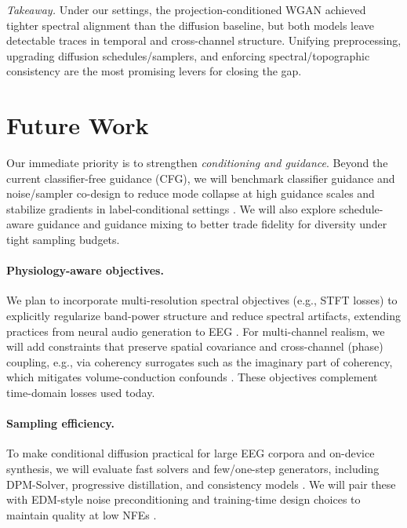 \documentclass{article}
\begin{document}
\smallskip
\noindent\emph{Takeaway.} Under our settings, the projection-conditioned WGAN achieved tighter spectral alignment than the diffusion baseline, but both models leave detectable traces in temporal and cross-channel structure. Unifying preprocessing, upgrading diffusion schedules/samplers, and enforcing spectral/topographic consistency are the most promising levers for closing the gap.



\section{Future Work}
Our immediate priority is to strengthen \emph{conditioning and guidance}. Beyond the current classifier-free guidance (CFG), we will benchmark classifier guidance and noise/sampler co-design to reduce mode collapse at high guidance scales and stabilize gradients in label-conditional settings \citep{dhariwal2021dmbeatgans,ho2022cfg,karras2022designspace}. We will also explore schedule-aware guidance and guidance mixing to better trade fidelity for diversity under tight sampling budgets.

\paragraph{Physiology-aware objectives.}
We plan to incorporate multi-resolution spectral objectives (e.g., STFT losses) to explicitly regularize band-power structure and reduce spectral artifacts, extending practices from neural audio generation to EEG \citep{yamamoto2020parallelwavegan}. For multi-channel realism, we will add constraints that preserve spatial covariance and cross-channel (phase) coupling, e.g., via coherency surrogates such as the imaginary part of coherency, which mitigates volume-conduction confounds \citep{nolte2004imagcoh}. These objectives complement time-domain losses used today.

\paragraph{Sampling efficiency.}
To make conditional diffusion practical for large EEG corpora and on-device synthesis, we will evaluate fast solvers and few/one-step generators, including DPM-Solver, progressive distillation, and consistency models \citep{lu2022dpmsolver,salimans2022distillation,song2023consistency}. We will pair these with EDM-style noise preconditioning and training-time design choices to maintain quality at low NFEs \citep{karras2022designspace}.
\end{document}
